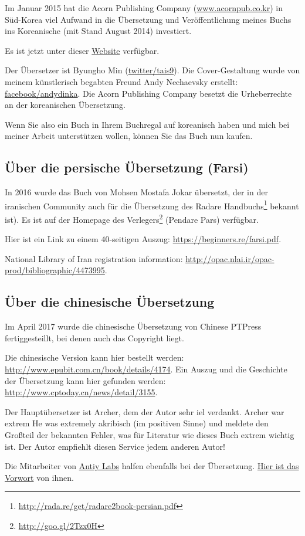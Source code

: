 Im Januar 2015 hat die Acorn Publishing Company (\href{http://www.acornpub.co.kr}{www.acornpub.co.kr}) in Süd-Korea
viel Aufwand in die Übersetzung und Veröffentlichung meines Buchs ins Koreanische (mit Stand August 2014) investiert.

Es ist jetzt unter dieser \href{http://go.yurichev.com/17343}{Website} verfügbar.

\iffalse
\begin{figure}[H]
\centering
\texttt{[image: acorn\_cover.jpg]}
\end{figure}
\fi

Der Übersetzer ist Byungho Min (\href{http://go.yurichev.com/17344}{twitter/tais9}).
Die Cover-Gestaltung wurde von meinem künstlerisch begabten Freund Andy Nechaevsky erstellt:
\href{http://go.yurichev.com/17023}{facebook/andydinka}.
Die Acorn Publishing Company besetzt die Urheberrechte an der koreanischen Übersetzung.

Wenn Sie also ein  Buch in Ihrem Buchregal auf koreanisch haben und 
mich bei meiner Arbeit unterstützen wollen, können Sie das Buch nun kaufen.

\subsection*{Über die persische Übersetzung (Farsi)}

In 2016 wurde das Buch von Mohsen Mostafa Jokar übersetzt, der in der iranischen Community
auch für die Übersetzung des Radare
Handbuchs\footnote{\url{http://rada.re/get/radare2book-persian.pdf}} bekannt ist).
Es ist auf der Homepage des Verlegers\footnote{\url{http://goo.gl/2Tzx0H}} (Pendare Pars)
verfügbar.

Hier ist ein Link zu einem 40-seitigen Auszug: \url{https://beginners.re/farsi.pdf}.

National Library of Iran registration information: \url{http://opac.nlai.ir/opac-prod/bibliographic/4473995}.

\subsection*{Über die chinesische Übersetzung}

Im April 2017 wurde die chinesische Übersetzung von Chinese PTPress fertiggesteillt, bei denen
auch das Copyright liegt.

Die chinesische Version kann hier bestellt werden: \url{http://www.epubit.com.cn/book/details/4174}.
Ein Auszug und die Geschichte der Übersetzung kann hier gefunden werden: \url{http://www.cptoday.cn/news/detail/3155}.

Der Hauptübersetzer ist Archer, dem der Autor sehr iel verdankt.
Archer war extrem He was extremely akribisch (im positiven Sinne) und meldete
den Großteil der bekannten Fehler, was für Literatur wie dieses Buch extrem wichtig ist.
Der Autor empfiehlt diesen Service jedem anderen Autor!

Die Mitarbeiter von \href{http://www.antiy.net/}{Antiy Labs} halfen ebenfalls bei der Übersetzung.
\href{http://www.epubit.com.cn/book/onlinechapter/51413}{Hier ist das Vorwort} von ihnen.
